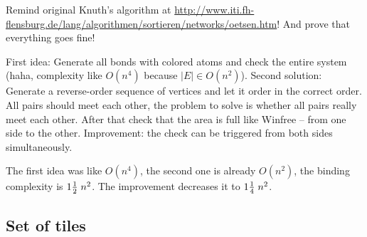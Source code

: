 
Remind original Knuth's algorithm at \url{http://www.iti.fh-flensburg.de/lang/algorithmen/sortieren/networks/oetsen.htm}! And prove that everything goes fine!

First idea: Generate all bonds with colored atoms and check the entire system (haha, complexity like $O(n^4)$ because $|E| \in O(n^2) $). Second solution: Generate a reverse-order sequence of vertices and let it order in the correct order. All pairs should meet each other, the problem to solve is whether all pairs really meet each other. After that check that the area is full like Winfree -- from one side to the other. Improvement: the check can be triggered from both sides simultaneously.

The first idea was like $O(n^4)$, the second one is already $O(n^2)$, the binding complexity is $1\nicefrac{1}{2}\;n^2$. The improvement decreases it to $1\nicefrac{1}{4}\;n^2$.

\subsection*{Set of tiles}

